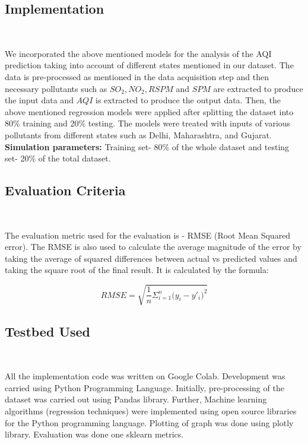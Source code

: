 \documentclass{article}
\begin{document}
\subsection {\color{brown}
\textbf{Implementation}} \\ 
\begin{itemize}
We incorporated the above mentioned models for the analysis of the AQI prediction taking into account of different states mentioned in our dataset. The data is pre-processed as mentioned in the data acquisition step and then necessary pollutants such as $SO_{2}, NO_{2}, RSPM$ and $SPM$ are extracted to produce the input data and $AQI$ is extracted to produce the output data. Then, the above mentioned regression models were applied after splitting the dataset into 80\% training and 20\% testing. The models were treated with inputs of various pollutants from different states such as Delhi, Maharashtra, and Gujarat. \\
\textbf{Simulation parameters:} Training set- 80\% of the whole dataset and testing set- 20\% of the total dataset. \\
\end{itemize}

\subsection {\color{brown}
\textbf{Evaluation Criteria}} \\
\begin{itemize}
 The evaluation metric used for the evaluation is - RMSE (Root Mean Squared error). The RMSE is also used to calculate the average magnitude of the error by taking the average of squared differences between actual vs predicted values and taking the square root of the final result. It is calculated by the formula: 
\end{itemize}

 \begin{equation*}
 RMSE = \sqrt{\frac{1}{n}\Sigma_{i=1}^{n}{\Big(y_i -y'_i\Big)^2}}
\end{equation*}

\subsection {\color{brown} \textbf{Testbed Used}} \\ 
\begin{itemize}
 All the implementation code was written on Google Colab.  Development was carried using Python Programming Language. Initially, pre-processing of the dataset was carried out using Pandas library. Further, Machine learning algorithms (regression techniques) were implemented using open source libraries for the Python programming language. Plotting of graph was done using plotly library. Evaluation was done one sklearn metrics. 
\end{itemize}
\end{document}
